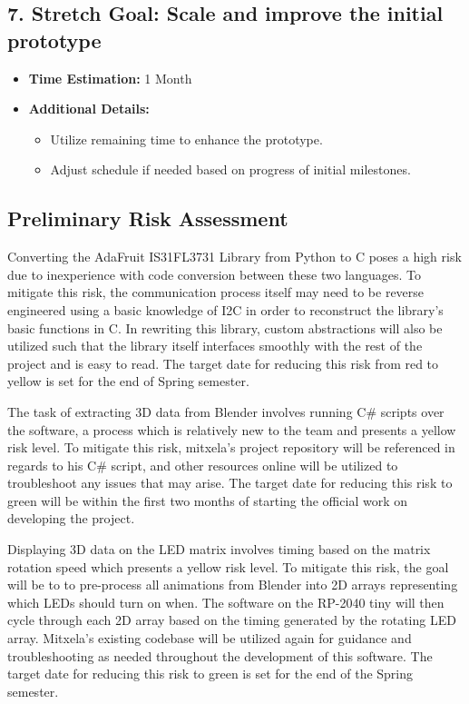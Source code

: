 \documentclass[11pt,journal]{IEEEtran}
\begin{document}
\subsection*{7. Stretch Goal: Scale and improve the initial prototype}
\begin{itemize}
  \item \textbf{Time Estimation:} 1 Month
  \item \textbf{Additional Details:} 
  \begin{itemize}
    \item Utilize remaining time to enhance the prototype.
    \item Adjust schedule if needed based on progress of initial milestones.
  \end{itemize}
\end{itemize}


\subsection{Preliminary Risk Assessment}



Converting the AdaFruit IS31FL3731 Library from Python to C poses a high risk due to inexperience with code conversion between these two languages. To mitigate this risk, the communication process itself may need to be reverse engineered using a basic knowledge of I2C in order to reconstruct the library’s basic functions in C. In rewriting this library, custom abstractions will also be utilized such that the library itself interfaces smoothly with the rest of the project and is easy to read. The target date for reducing this risk from red to yellow is set for the end of Spring semester.

The task of extracting 3D data from Blender involves running C\# scripts over the software, a process which is relatively new to the team and presents a yellow risk level. To mitigate this risk, mitxela’s project repository will be referenced in regards to his C\# script, and other resources online will be utilized to troubleshoot any issues that may arise. The target date for reducing this risk to green will be within the first two months of starting the official work on developing the project.



Displaying 3D data on the LED matrix involves timing based on the matrix rotation speed which presents a yellow risk level. To mitigate this risk, the goal will be to to pre-process all animations from Blender into 2D arrays representing which LEDs should turn on when. The software on the RP-2040 tiny will then cycle through each 2D array based on the timing generated by the rotating LED array. Mitxela’s existing codebase will be utilized again for guidance and troubleshooting as needed throughout the development of this software. The target date for reducing this risk to green is set for the end of the Spring semester.
\end{document}
